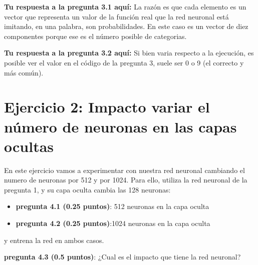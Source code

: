 \documentclass[12pt,a4paper,table]{article}
\providecommand{\tightlist}{%
      \setlength{\itemsep}{0pt}\setlength{\parskip}{0pt}}
\begin{document}
    \textbf{Tu respuesta a la pregunta 3.1 aquí:} La razón es que cada elemento es un
vector que representa un valor de la función real que la red neuronal
está imitando, en una palabra, son probabilidades. En este caso es un
vector de diez componentes porque ese es el número posible de
categorias.

    \textbf{Tu respuesta a la pregunta 3.2 aquí:} Si bien varia respecto a la
ejecución, es posible ver el valor en el código de la pregunta 3, suele
ser 0 o 9 (el correcto y más común).

    \hypertarget{ejercicio-2-impacto-variar-el-nuxfamero-de-neuronas-en-las-capas-ocultas}{%
\section{\texorpdfstring{\textbf{Ejercicio 2: Impacto variar el número
de neuronas en las capas
ocultas}}{Ejercicio 2: Impacto variar el número de neuronas en las capas ocultas}}\label{ejercicio-2-impacto-variar-el-nuxfamero-de-neuronas-en-las-capas-ocultas}}

En este ejercicio vamos a experimentar con nuestra red neuronal
cambiando el numero de neuronas por 512 y por 1024. Para ello, utiliza
la red neuronal de la pregunta 1, y su capa oculta cambia las 128
neuronas:

\begin{itemize}
\tightlist
\item
  \textbf{pregunta 4.1 (0.25 puntos)}: 512 neuronas en la capa oculta
\item
  \textbf{pregunta 4.2 (0.25 puntos)}:1024 neuronas en la capa oculta
\end{itemize}

y entrena la red en ambos casos.

\textbf{pregunta 4.3 (0.5 puntos)}: ¿Cual es el impacto que tiene la red
neuronal?
\end{document}
